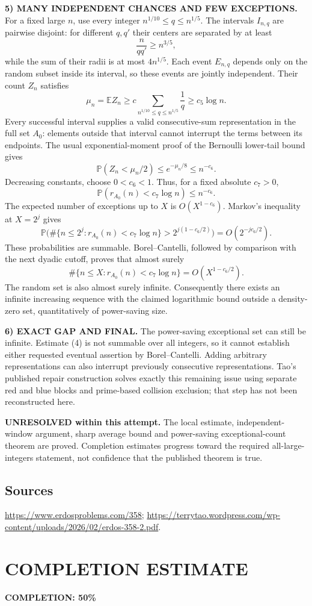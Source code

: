 \noindent\textbf{5) MANY INDEPENDENT CHANCES AND FEW EXCEPTIONS.}
For a fixed large $n$, use every integer
$n^{1/10}\le q\le n^{1/5}$. The intervals $I_{n,q}$ are pairwise disjoint: for different $q,q'$ their centers are separated by at least
\[
 \frac n{qq'}\ge n^{3/5},
\]
while the sum of their radii is at most $4n^{1/5}$. Each event $E_{n,q}$ depends only on the random subset inside its interval, so these events are jointly independent. Their count $Z_n$ satisfies
\[
 \mu_n=\mathbb E Z_n\ge c\sum_{n^{1/10}\le q\le n^{1/5}}\frac1q
 \ge c_5\log n.
\]
Every successful interval supplies a valid consecutive-sum representation in the full set $A_0$: elements outside that interval cannot interrupt the terms between its endpoints. The usual exponential-moment proof of the Bernoulli lower-tail bound gives
\[
 \mathbb P(Z_n<\mu_n/2)\le e^{-\mu_n/8}\le n^{-c_6}.
\]
Decreasing constants, choose $0<c_6<1$. Thus, for a fixed absolute $c_7>0$,
\[
 \mathbb P(r_{A_0}(n)<c_7\log n)\le n^{-c_6}. \tag{4}
\]
The expected number of exceptions up to $X$ is $O(X^{1-c_6})$. Markov's inequality at $X=2^j$ gives
\[
 \mathbb P\big(\#\{n\le2^j:r_{A_0}(n)<c_7\log n\}
                  >2^{j(1-c_6/2)}\big)=O(2^{-jc_6/2}).
\]
These probabilities are summable. Borel--Cantelli, followed by comparison with the next dyadic cutoff, proves that almost surely
\[
 \#\{n\le X:r_{A_0}(n)<c_7\log n\}=O(X^{1-c_6/2}).
\]
The random set is also almost surely infinite. Consequently there exists an infinite increasing sequence with the claimed logarithmic bound outside a density-zero set, quantitatively of power-saving size.

\noindent\textbf{6) EXACT GAP AND FINAL.}
The power-saving exceptional set can still be infinite. Estimate (4) is not summable over all integers, so it cannot establish either requested eventual assertion by Borel--Cantelli. Adding arbitrary representations can also interrupt previously consecutive representations. Tao's published repair construction solves exactly this remaining issue using separate red and blue blocks and prime-based collision exclusion; that step has not been reconstructed here.

\textbf{UNRESOLVED within this attempt.} The local estimate, independent-window argument, sharp average bound and power-saving exceptional-count theorem are proved. Completion estimates progress toward the required all-large-integers statement, not confidence that the published theorem is true.

\subsection*{Sources}
\url{https://www.erdosproblems.com/358}; \url{https://terrytao.wordpress.com/wp-content/uploads/2026/02/erdos-358-2.pdf}.

\section{COMPLETION ESTIMATE}
\textbf{COMPLETION: 50\%}
